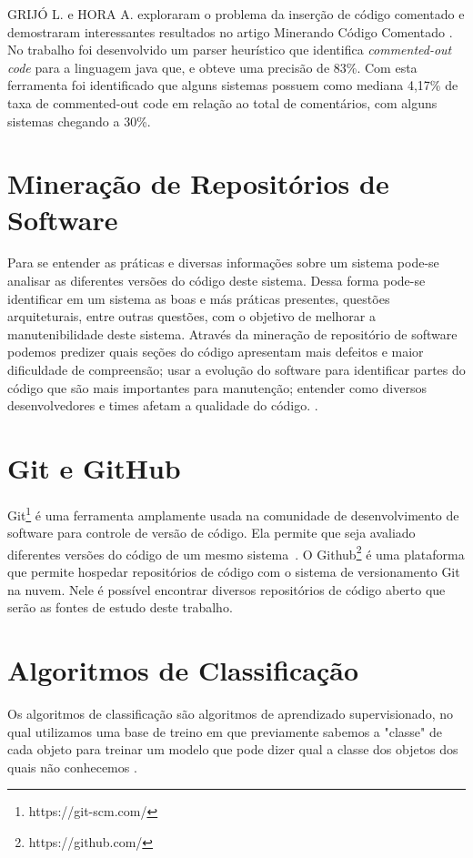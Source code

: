 \documentclass{abnt}
\begin{document}
GRIJÓ L. e HORA A. exploraram o problema da inserção de código comentado 
e demostraram interessantes resultados no artigo Minerando Código Comentado 
\cite{articleMiningComments}. No trabalho foi desenvolvido um parser heurístico
que identifica \textit{commented-out code} para a linguagem java que, e obteve
uma precisão de 83\%. Com esta ferramenta foi identificado que alguns 
sistemas possuem como mediana 4,17\% de taxa de commented-out code em relação
ao total de comentários, com alguns sistemas chegando a 30\%.


\section{Mineração de Repositórios de Software}

Para se entender as práticas e diversas informações sobre um sistema pode-se
analisar as diferentes versões do código deste sistema. Dessa forma pode-se 
identificar em um sistema as boas e más práticas presentes, questões arquiteturais,
entre outras questões, com o objetivo de melhorar a manutenibilidade deste sistema.
Através da mineração de repositório de software podemos 
predizer quais seções do código apresentam mais defeitos e maior
dificuldade de compreensão; usar a evolução do software para identificar
partes do código que são mais importantes para manutenção; entender como diversos
desenvolvedores e times afetam a qualidade do código.
\cite{crimeScene}. 


\section{Git e GitHub}

Git\footnote{https://git-scm.com/} é uma ferramenta amplamente usada na 
comunidade de desenvolvimento de software para controle de versão de código.
Ela permite que seja avaliado diferentes versões do código de um mesmo 
sistema~\cite{articleMiningGit}. O Github\footnote{https://github.com/} é 
uma plataforma que permite hospedar repositórios de código com o sistema de versionamento
Git na nuvem. Nele é possível encontrar diversos repositórios de código aberto 
que serão as fontes de estudo deste trabalho. 

\section{Algoritmos de Classificação}
Os algoritmos de classificação são algoritmos de aprendizado supervisionado,
no qual utilizamos uma base de treino em que previamente sabemos a "classe" 
de cada objeto para treinar um modelo que pode dizer qual a classe dos 
objetos dos quais não conhecemos \cite{patternClassification}.
\end{document}
